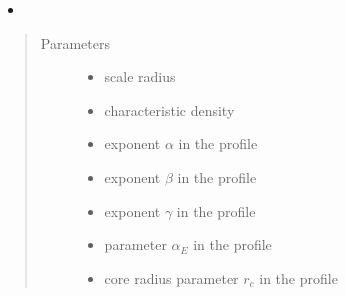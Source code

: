 \documentclass[letterpaper,10pt,english]{sphinxmanual}
\begin{document}
\begin{fulllineitems}
\begin{quote}
\begin{description}
\end{description}\end{quote}
\begin{itemize}
\item {} 
\sphinxAtStartPar
{}

\end{itemize}
\begin{quote}\begin{description}
\item[{Parameters}] \leavevmode\begin{itemize}
\item {} 
\sphinxAtStartPar
{} \textendash{} scale radius

\item {} 
\sphinxAtStartPar
{} \textendash{} characteristic density

\item {} 
\sphinxAtStartPar
{} \textendash{} exponent \(\alpha\) in the {\hyperref[\detokenize{diffsph.profiles:diffsph.profiles.templates.hdz}]{}} profile

\item {} 
\sphinxAtStartPar
{} \textendash{} exponent \(\beta\) in the {\hyperref[\detokenize{diffsph.profiles:diffsph.profiles.templates.hdz}]{}} profile

\item {} 
\sphinxAtStartPar
{} \textendash{} exponent \(\gamma\) in the {\hyperref[\detokenize{diffsph.profiles:diffsph.profiles.templates.hdz}]{}} profile

\item {} 
\sphinxAtStartPar
{} \textendash{} parameter \(\alpha_E\) in the {\hyperref[\detokenize{diffsph.profiles:diffsph.profiles.templates.enst}]{}} profile

\item {} 
\sphinxAtStartPar
{} \textendash{} core radius parameter \(r_c\) in the {\hyperref[\detokenize{diffsph.profiles:diffsph.profiles.templates.cnfw}]{}} profile


\end{itemize}
\end{description}
\end{quote}
\end{fulllineitems}
\end{document}
